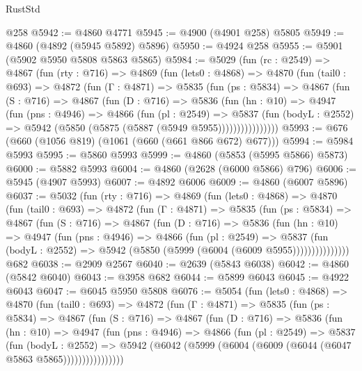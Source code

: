\begin{lexlean}{RustStd}
\begin{coremodule}
    @258
@5942 := @4860 @4771
@5945 := @4900 (@4901 @258) @5805
@5949 := @4860 (@4892 (@5945 @5892) @5896)
@5950 := @4924 @258
@5955 := @5901 (@5902 @5950 @5808 @5863 @5865)
@5984 := @5029
    (fun (rc : @2549) =>
    @4867
      (fun (rty : @716) =>
      @4869
        (fun (lets0 : @4868) =>
        @4870
          (fun (tail0 : @693) =>
          @4872
            (fun (Γ : @4871) =>
            @5835
              (fun (ps : @5834) =>
              @4867
                (fun (S : @716) =>
                @4867
                  (fun (D : @716) =>
                  @5836
                    (fun (hn : @10) =>
                    @4947
                      (fun (pns : @4946) =>
                      @4866
                        (fun (pl : @2549) =>
                        @5837
                          (fun (bodyL : @2552) =>
                          @5942 (@5850 (@5875 (@5887 (@5949 @5955))))))))))))))))
@5993 := @676 (@660 (@1056 @819) (@1061 (@660 (@661 @866 @672) @677)))
@5994 := @5984 @5993
@5995 := @5860 @5993
@5999 := @4860 (@5853 (@5995 @5866) @5873)
@6000 := @5882 @5993
@6004 := @4860 (@2628 (@6000 @5866) @796)
@6006 := @5945 (@4907 @5993)
@6007 := @4892 @6006
@6009 := @4860 (@6007 @5896)
@6037 := @5032
    (fun (rty : @716) =>
    @4869
      (fun (lets0 : @4868) =>
      @4870
        (fun (tail0 : @693) =>
        @4872
          (fun (Γ : @4871) =>
          @5835
            (fun (ps : @5834) =>
            @4867
              (fun (S : @716) =>
              @4867
                (fun (D : @716) =>
                @5836
                  (fun (hn : @10) =>
                  @4947
                    (fun (pns : @4946) =>
                    @4866
                      (fun (pl : @2549) =>
                      @5837
                        (fun (bodyL : @2552) =>
                        @5942 (@5850 (@5999 (@6004 (@6009 @5955)))))))))))))))
    @682
@6038 := @2909 @2567
@6040 := @2639 (@5843 @6038)
@6042 := @4860 (@5842 @6040)
@6043 := @3958 @682
@6044 := @5899 @6043
@6045 := @4922 @6043
@6047 := @6045 @5950 @5808
@6076 := @5054
    (fun (lets0 : @4868) =>
    @4870
      (fun (tail0 : @693) =>
      @4872
        (fun (Γ : @4871) =>
        @5835
          (fun (ps : @5834) =>
          @4867
            (fun (S : @716) =>
            @4867
              (fun (D : @716) =>
              @5836
                (fun (hn : @10) =>
                @4947
                  (fun (pns : @4946) =>
                  @4866
                    (fun (pl : @2549) =>
                    @5837
                      (fun (bodyL : @2552) =>
                      @5942 (@6042 (@5999 (@6004 (@6009 (@6044 (@6047 @5863 @5865))))))))))))))))

\end{coremodule}
\end{lexlean}
